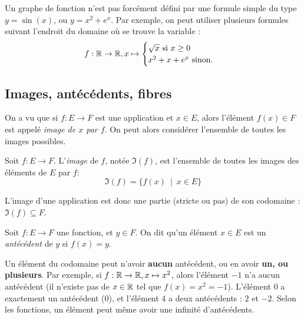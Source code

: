 \begin{remarque}
Un graphe de fonction n'est pas forcément défini par une formule simple du type $y=\sin(x)$, ou $y=x^2+e^x$. Par exemple, on peut utiliser plusieurs formules suivant l'endroit du domaine où se trouve la variable :
\[ f: 
\mathbb{R} \to \mathbb{R}, 
x\mapsto \begin{cases}\sqrt{x}\text{ si }x\geq 0\\ x^2+x+e^x\text{ sinon.}\end{cases}\]
\end{remarque}

\subsection{Images, antécédents, fibres}

On a vu que si $f : E\to F$ est une application et $x\in E$, alors l'élément $f(x)\in F$ est appelé \emph{image de $x$ par $f$}. On peut alors considérer l'ensemble de toutes les images possibles.

\begin{definition}
Soit $f : E\to F$. L'\emph{image} de $f$, notée $\Im(f)$, est l'ensemble de toutes les images des éléments de $E$ par $f$:
\[
\Im(f) = \{f(x)\:\mid\: x\in E\}
\]
\end{definition}

L'image d'une application est donc une partie (stricte ou pas) de son codomaine : $\Im(f)\subseteq F$.

\begin{definition}
Soit $f : E\to F$ une fonction, et $y\in F$. On dit qu'un élément $x\in E$ est un \emph{antécédent} de $y$ si $f(x)=y$.
\end{definition}

\begin{attention}
Un élément du codomaine peut n'avoir \textbf{aucun} antécédent, ou en avoir \textbf{un, ou plusieurs}. Par exemple, si $f : \mathbb{R}\to \mathbb{R}, x\mapsto x^2$, alors l'élément $-1$ n'a aucun antécédent (il n'existe pas de $x\in \mathbb{R}$ tel que $f(x)=x^2=-1$). L'élément $0$ a exactement un antécédent ($0$), et l'élément $4$ a deux antécédents : $2$ et $-2$. Selon les fonctions, un élément peut même avoir une infinité d'antécédents.
\end{attention}

